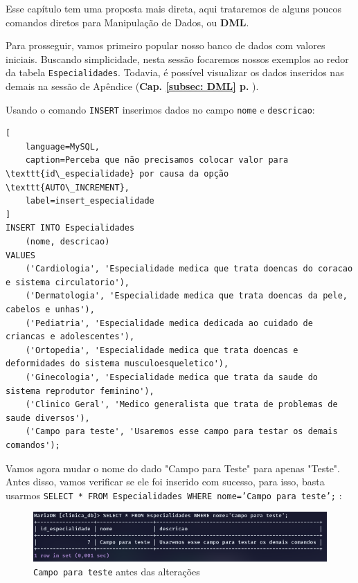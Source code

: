 %
%
%
%
Esse capítulo tem uma proposta mais direta, aqui trataremos de alguns poucos comandos diretos para Manipulação de Dados, ou \textbf{DML}.

Para prosseguir, vamos primeiro popular nosso banco de dados com valores iniciais. Buscando simplicidade, nesta sessão focaremos nossos exemplos ao redor da tabela \texttt{Especialidades}. Todavia, é possível visualizar os dados inseridos nas demais na sessão de Apêndice (\textbf{Cap. \ref{subsec: DML} p. \pageref{subsec: DML}}). 

Usando o comando \texttt{INSERT} inserimos dados no campo \texttt{nome} e \texttt{descricao}:

\begin{lstlisting}[
    language=MySQL,
    caption=Perceba que não precisamos colocar valor para \texttt{id\_especialidade} por causa da opção \texttt{AUTO\_INCREMENT},
    label=insert_especialidade
]
INSERT INTO Especialidades 
    (nome, descricao) 
VALUES
    ('Cardiologia', 'Especialidade medica que trata doencas do coracao e sistema circulatorio'),
    ('Dermatologia', 'Especialidade medica que trata doencas da pele, cabelos e unhas'),
    ('Pediatria', 'Especialidade medica dedicada ao cuidado de criancas e adolescentes'),
    ('Ortopedia', 'Especialidade medica que trata doencas e deformidades do sistema musculoesqueletico'),
    ('Ginecologia', 'Especialidade medica que trata da saude do sistema reprodutor feminino'),
    ('Clinico Geral', 'Medico generalista que trata de problemas de saude diversos'),
    ('Campo para teste', 'Usaremos esse campo para testar os demais comandos');
\end{lstlisting}

Vamos agora mudar o nome do dado "Campo para Teste" para apenas "Teste". Antes disso, vamos verificar se ele foi inserido com sucesso, para isso, basta usarmos \texttt{SELECT * FROM Especialidades WHERE nome='Campo para teste';} :

\begin{figure}[H]
    \centering
    \includegraphics[width=1\linewidth]{Text//DML/campo_teste.png}
    \caption{\texttt{Campo para teste} antes das alterações}
    \label{fig:CampoTeste1}
\end{figure}

